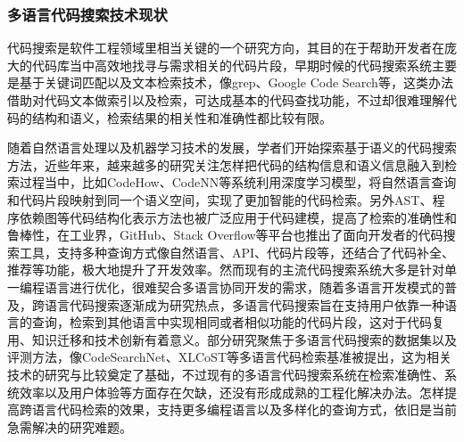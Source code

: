 \documentclass[UTF8,a4paper,12pt]{ctexart}
\numberwithin{equation}{section}
\begin{document}
\subsubsection{多语言代码搜索技术现状}
代码搜索是软件工程领域里相当关键的一个研究方向，其目的在于帮助开发者在庞大的代码库当中高效地找寻与需求相关的代码片段，早期时候的代码搜索系统主要是基于关键词匹配以及文本检索技术，像grep、Google Code Search等，这类办法借助对代码文本做索引以及检索，可达成基本的代码查找功能，不过却很难理解代码的结构和语义，检索结果的相关性和准确性都比较有限。\par
随着自然语言处理以及机器学习技术的发展，学者们开始探索基于语义的代码搜索方法\cite{ref0}，近些年来，越来越多的研究关注怎样把代码的结构信息和语义信息融入到检索过程当中，比如CodeHow\cite{ref1}、CodeNN\cite{ref2}等系统利用深度学习模型，将自然语言查询和代码片段映射到同一个语义空间，实现了更加智能的代码检索。另外AST、程序依赖图等代码结构化表示方法也被广泛应用于代码建模，提高了检索的准确性和鲁棒性，在工业界，GitHub、Stack Overflow等平台也推出了面向开发者的代码搜索工具，支持多种查询方式像自然语言、API、代码片段等，还结合了代码补全、推荐等功能，极大地提升了开发效率。然而现有的主流代码搜索系统大多是针对单一编程语言进行优化，很难契合多语言协同开发的需求，随着多语言开发模式的普及，跨语言代码搜索逐渐成为研究热点，多语言代码搜索旨在支持用户依靠一种语言的查询，检索到其他语言中实现相同或者相似功能的代码片段，这对于代码复用、知识迁移和技术创新有着意义。部分研究聚焦于多语言代码搜索的数据集以及评测方法，像CodeSearchNet\cite{ref6}、XLCoST\cite{ref7}等多语言代码检索基准被提出，这为相关技术的研究与比较奠定了基础，不过现有的多语言代码搜索系统在检索准确性、系统效率以及用户体验等方面存在欠缺，还没有形成成熟的工程化解决办法。怎样提高跨语言代码检索的效果，支持更多编程语言以及多样化的查询方式，依旧是当前急需解决的研究难题。\par
\end{document}
